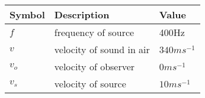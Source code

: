 \begin{tabular}{ | m{1.0cm} | m{3cm} |m{1.0cm}| } 
  \hline
 Symbol & Description  & Value\\ 
 \hline
 $f$ & frequency of source & 400Hz\\
\hline
$v$& velocity of sound in air   &  $340 ms^{-1} $\\
\hline
$v_o$& velocity of observer   &  $0 ms^{-1} $\\
\hline
$v_s$& velocity of source   &  $10 ms^{-1} $\\
\hline

\end{tabular}\\
\caption{}
\label{Table:2}